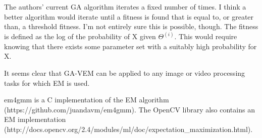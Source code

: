 \documentclass[11pt]{article}
\begin{document}
The authors' current GA algorithm iterates a fixed number of times. I think a
better algorithm would iterate until a fitness is found that is equal to, or
greater than, a threshold fitness. I'm not entirely sure this is possible,
though. The fitness is defined as the log of the probability of X given
\(\Theta^{(i)}\). This would require knowing that there exists some parameter
set with a suitably high probability for X.

It seems clear that GA-VEM can be applied to any image or video processing tasks
for which EM is used.

em4gmm is a C implementation of the EM algorithm \\
(https://github.com/juandavm/em4gmm). The OpenCV library also contains an EM
implementation \\
(http://docs.opencv.org/2.4/modules/ml/doc/expectation\_maximization.html).



\end{document}
